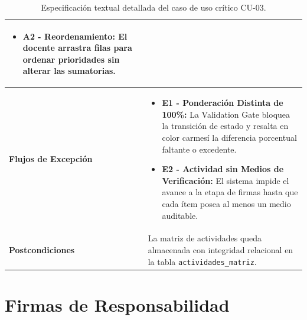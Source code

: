 \documentclass[12pt,a4paper]{article}
\begin{document}
\begin{table}[H]
\begin{tabularx}{\textwidth}{|>{\hsize=0.7\hsize\raggedright\arraybackslash\bfseries\footnotesize}X|>{\hsize=1.3\hsize\raggedright\arraybackslash\footnotesize}X|}
\begin{itemize}[leftmargin=1.2em, itemsep=1pt]
    \item \textbf{A2 - Reordenamiento:} El docente arrastra filas para ordenar prioridades sin alterar las sumatorias.
\end{itemize} \\
\hline
Flujos de Excepción & 
\begin{itemize}[leftmargin=1.2em, itemsep=1pt]
    \item \textbf{E1 - Ponderación Distinta de 100\%:} La Validation Gate bloquea la transición de estado y resalta en color carmesí la diferencia porcentual faltante o excedente.
    \item \textbf{E2 - Actividad sin Medios de Verificación:} El sistema impide el avance a la etapa de firmas hasta que cada ítem posea al menos un medio auditable.
\end{itemize} \\
\hline
Postcondiciones & La matriz de actividades queda almacenada con integridad relacional en la tabla \texttt{actividades\_\allowbreak  matriz}. \\
\hline
\end{tabularx}
\caption{Especificación textual detallada del caso de uso crítico CU-03.}
\label{tab:cu_03_detalle}
\end{table}

\section{Firmas de Responsabilidad}
\end{document}
